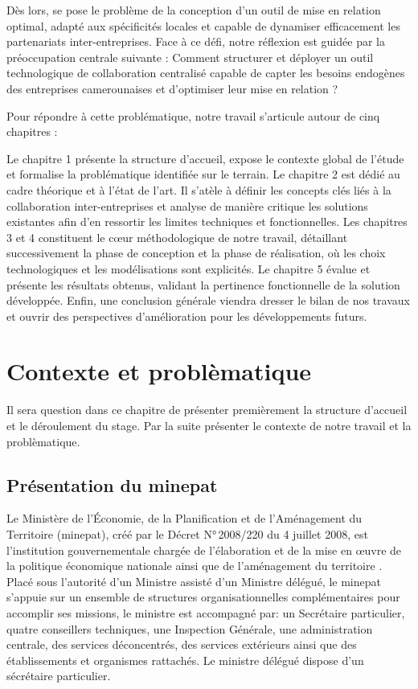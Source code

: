 \documentclass[12pt, a4paper, oneside]{report}
\begin{document}
Dès lors, se pose le problème de la conception d'un outil de mise en relation optimal, adapté aux spécificités locales et capable de dynamiser efficacement les partenariats inter-entreprises. Face à ce défi, notre réflexion est guidée par la préoccupation centrale suivante : Comment structurer et déployer un outil technologique de collaboration centralisé capable de capter les besoins endogènes des entreprises camerounaises et d'optimiser leur mise en relation ?

Pour répondre à cette problématique, notre travail s'articule autour de cinq chapitres :

Le chapitre 1 présente la structure d'accueil, expose le contexte global de l'étude et formalise la problématique identifiée sur le terrain. Le chapitre 2 est dédié au cadre théorique et à l'état de l'art. Il s'atèle à définir les concepts clés liés à la collaboration inter-entreprises et analyse de manière critique les solutions existantes afin d'en ressortir les limites techniques et fonctionnelles. Les chapitres 3 et 4 constituent le cœur méthodologique de notre travail, détaillant successivement la phase de conception et la phase de réalisation, où les choix technologiques et les modélisations sont explicités. Le chapitre 5 évalue et présente les résultats obtenus, validant la pertinence fonctionnelle de la solution développée. Enfin, une conclusion générale viendra dresser le bilan de nos travaux et ouvrir des perspectives d'amélioration pour les développements futurs.

	\chapter{Contexte et problèmatique}
	\label{chap:structure}
Il sera question dans ce chapitre de présenter premièrement la structure d'accueil et le déroulement du stage. Par la suite présenter le contexte de notre travail et la problèmatique.
\section[Présentation du MINEPAT]{Présentation du \gls{minepat}}
\label{sec:minepat}

Le Ministère de l'Économie, de la Planification et de l'Aménagement du Territoire
(\gls{minepat}), créé par le Décret N°\,2008/220 du 4 juillet 2008, est l'institution
gouvernementale chargée de l'élaboration et de la mise en \oe uvre de la politique
économique nationale ainsi que de l'aménagement du territoire \cite{decret2008}. Placé sous l'autorité
d'un Ministre assisté d'un Ministre délégué, le \gls{minepat} s'appuie sur un ensemble
de structures organisationnelles complémentaires pour accomplir ses missions, le ministre est accompagné par: un
Secrétaire particulier, quatre conseillers techniques, une Inspection Générale, une
administration centrale, des services déconcentrés, des services extérieurs ainsi que
des établissements et organismes rattachés. Le ministre délégué dispose d'un sécrétaire particulier.
\end{document}
